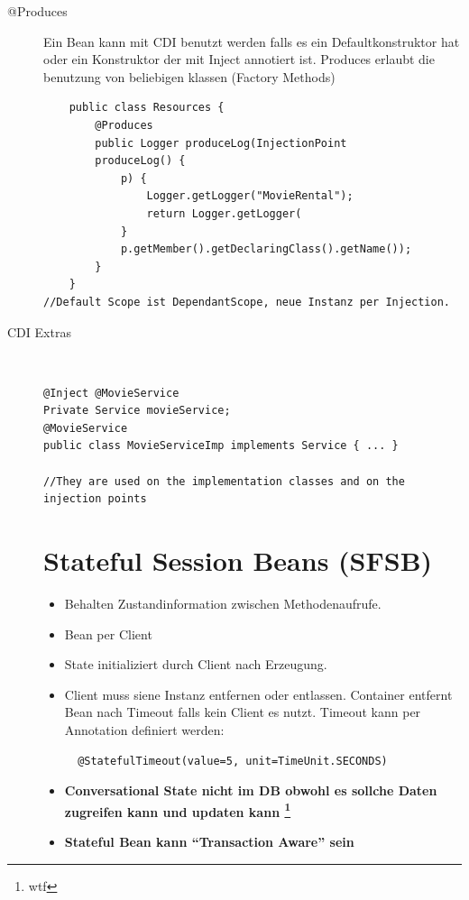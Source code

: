 \documentclass[a4paper,10pt]{scrreprt}
\begin{document}
\begin{description}
 \item [@Produces] Ein Bean kann mit CDI benutzt werden falls es ein Defaultkonstruktor hat oder ein Konstruktor der 
mit Inject annotiert ist.
Produces erlaubt die benutzung von beliebigen klassen (Factory Methods)

\begin{lstlisting}
	public class Resources {
		@Produces
		public Logger produceLog(InjectionPoint
		produceLog() {
			p) {
				Logger.getLogger("MovieRental");
				return Logger.getLogger(
			}
			p.getMember().getDeclaringClass().getName());
		}
	}
//Default Scope ist DependantScope, neue Instanz per Injection.
\end{lstlisting}

\item[CDI Extras] \hfill \\
\begin{lstlisting}[caption=CDI mit Qualifier]
 @Inject @MovieService
Private Service movieService;
@MovieService
public class MovieServiceImp implements Service { ... }

//They are used on the implementation classes and on the injection points

\end{lstlisting}

\chapter{Stateful Session Beans (SFSB)}
\begin{itemize}
 \item Behalten Zustandinformation zwischen Methodenaufrufe.
 \item Bean per Client
 \item State initializiert durch Client nach Erzeugung.
 \item Client muss siene Instanz entfernen oder entlassen.
 \subitem Container entfernt Bean nach Timeout falls kein Client es nutzt.
 \subitem Timeout kann per Annotation definiert werden: \\
 \begin{verbatim}
  @StatefulTimeout(value=5, unit=TimeUnit.SECONDS)
 \end{verbatim}
\item \textbf{Conversational State nicht im DB obwohl es sollche Daten zugreifen kann und updaten kann \footnote{wtf}}
\item \textbf{Stateful Bean kann ``Transaction Aware'' sein}
\end{itemize}

\end{description}
\end{document}
